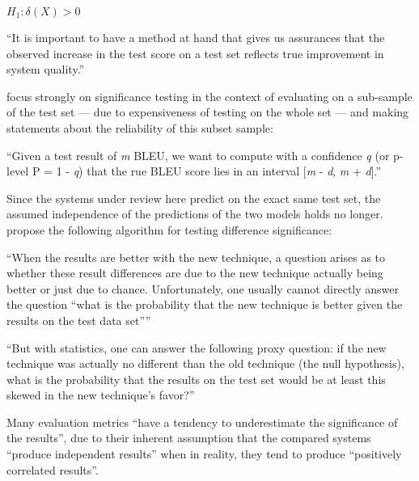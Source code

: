 $H_1:\delta(X) > 0$

``It is important to have a method at hand that gives us assurances that the
observed increase in the test score on a test set reflects true improvement in system
quality.'' \citep{koehn2004statistical}

\citet{koehn2004statistical} focus strongly on significance testing in the context of evaluating
on a sub-sample of the test set --- due to expensiveness of testing on the whole set ---
and making statements about the reliability of this subset sample:

``Given a test result of \emph{m} BLEU, we want to compute with a confidence \emph{q} (or
p-level P = 1 - \emph{q}) that the rue BLEU score lies in an interval [\emph{m} - \emph{d},
\emph{m} + \emph{d}].'' \citep{koehn2004statistical}

Since the systems under review here predict on the exact same test set, the assumed independence
of the predictions of the two models holds no longer. \citet{morgan2005statistical} propose
the following algorithm for testing difference significance:

``When the results are better with the new technique, a question arises as to whether
these result differences are due to the new technique actually being better or just due to
chance. Unfortunately, one usually cannot directly answer the question “what is the probability
that the new technique is better given the results on the test data set”'' \citep{yeh2000more}

``But with statistics, one can answer the following proxy question: if the new technique was
actually no different than the old technique (the null hypothesis), what is the probability
that the results on the test set would be at least this skewed in the new technique’s
favor?'' \citep{yeh2000more}

Many evaluation metrics ``have a tendency to underestimate the significance of the results'',
due to their inherent assumption that the compared systems ``produce independent results''
when in reality, they tend to produce ``positively correlated results''. \citep{yeh2000more}


